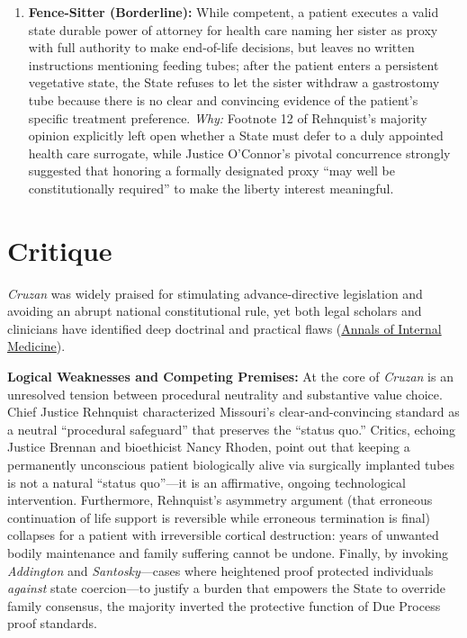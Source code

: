 \documentclass[12pt]{article}
\begin{document}
\begin{enumerate}
  \item \textbf{Fence-Sitter (Borderline):} While competent, a patient executes a valid state durable power of attorney for health care naming her sister as proxy with full authority to make end-of-life decisions, but leaves no written instructions mentioning feeding tubes; after the patient enters a persistent vegetative state, the State refuses to let the sister withdraw a gastrostomy tube because there is no clear and convincing evidence of the patient's specific treatment preference. \textit{Why:} Footnote 12 of Rehnquist's majority opinion explicitly left open whether a State must defer to a duly appointed health care surrogate, while Justice O'Connor's pivotal concurrence strongly suggested that honoring a formally designated proxy ``may well be constitutionally required'' to make the liberty interest meaningful.
\end{enumerate}

\section{Critique}

\textit{Cruzan} was widely praised for stimulating advance-directive legislation and avoiding an abrupt national constitutional rule, yet both legal scholars and clinicians have identified deep doctrinal and practical flaws (\href{https://www.acpjournals.org/doi/10.7326/0003-4819-114-10-895}{Annals of Internal Medicine}).

\textbf{Logical Weaknesses and Competing Premises:} At the core of \textit{Cruzan} is an unresolved tension between procedural neutrality and substantive value choice. Chief Justice Rehnquist characterized Missouri's clear-and-convincing standard as a neutral ``procedural safeguard'' that preserves the ``status quo.'' Critics, echoing Justice Brennan and bioethicist Nancy Rhoden, point out that keeping a permanently unconscious patient biologically alive via surgically implanted tubes is not a natural ``status quo''---it is an affirmative, ongoing technological intervention. Furthermore, Rehnquist's asymmetry argument (that erroneous continuation of life support is reversible while erroneous termination is final) collapses for a patient with irreversible cortical destruction: years of unwanted bodily maintenance and family suffering cannot be undone. Finally, by invoking \textit{Addington} and \textit{Santosky}---cases where heightened proof protected individuals \textit{against} state coercion---to justify a burden that empowers the State to override family consensus, the majority inverted the protective function of Due Process proof standards.
\end{document}
